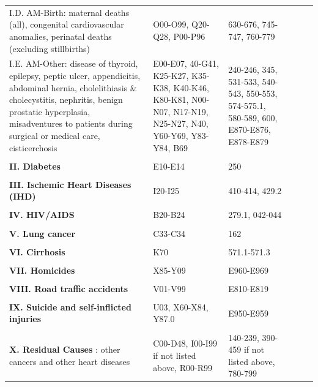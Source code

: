 \documentclass[11.5pt]{article}
\begin{document}
{\begin{longtable}{p{8cm}p{4cm}p{4cm}ccc}
          I.D. AM-Birth: maternal deaths (all), congenital cardiovascular anomalies, perinatal deaths (excluding stillbirths) & O00-O99, Q20-Q28, P00-P96 & 630-676, 745-747, 760-779\\
          I.E. AM-Other: disease of thyroid, epilepsy, peptic ulcer, appendicitis, abdominal hernia, cholelithiasis \& cholecystitis, nephritis, benign prostatic hyperplasia, misadventures to patients during surgical or medical care, cisticerchosis & E00-E07, 40-G41, K25-K27, K35-K38, K40-K46, K80-K81,  N00-N07, N17-N19, N25-N27, N40, Y60-Y69, Y83-Y84, B69 & 240-246, 345, 531-533, 540-543, 550-553, 574-575.1, 580-589, 600, E870-E876, E878-E879\\
 & \\          
 {\bf II. Diabetes}  & E10-E14 & 250 \\      
 & \\
 {\bf III. Ischemic Heart Diseases (IHD)}   & I20-I25 & 410-414, 429.2\\
 & \\           
 {\bf IV. HIV/AIDS} & B20-B24 & 279.1, 042-044\\ 
  & \\                
{\bf V. Lung cancer}  & C33-C34 & 162\\
  & \\          
{\bf VI. Cirrhosis}&  K70 & 571.1-571.3\\
 & \\          
{\bf VII. Homicides}  & X85-Y09 & E960-E969\\     
 & \\           
 {\bf VIII. Road traffic accidents}  & V01-V99 & E810-E819 \\     
 & \\           
{\bf IX. Suicide and self-inflicted injuries}  & U03, X60-X84, Y87.0 & E950-E959\\ 
 & \\          
{\bf X. Residual Causes }:  other cancers and other heart diseases & C00-D48, I00-I99 if not listed above, R00-R99 & 140-239, 390-459 if not listed above, 780-799
\label{ME_Mex}
\end{longtable}

}
\end{document}
